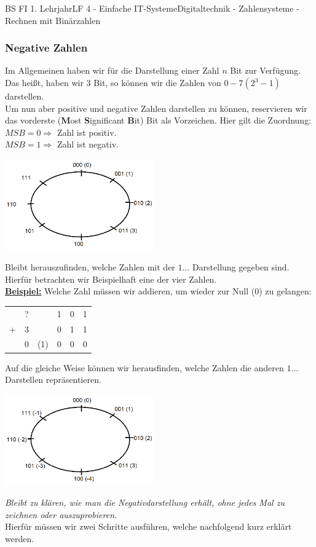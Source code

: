 \documentclass[11pt,twocolumn,oneside,openany,headings=optiontotoc,11pt,numbers=noenddot]{article}
\begin{document}
\begin{worksheet}{BS FI 1. Lehrjahr}{LF 4 - Einfache IT-Systeme}{Digitaltechnik - Zahlensysteme - Rechnen mit Binärzahlen}
		\subsubsection{Negative Zahlen}
		Im Allgemeinen haben wir für die Darstellung einer Zahl \(n\) Bit zur Verfügung. Das heißt, haben wir 3 Bit, so können wir die Zahlen von \(0 - 7 (2^3-1)\) darstellen.\\
		Um nun aber positive und negative Zahlen darstellen zu können, reservieren wir das vorderste (\textbf{M}ost \textbf{S}ignificant \textbf{B}it) Bit als Vorzeichen. Hier gilt die Zuordnung:\\
		\(MSB = 0 \Rightarrow\) Zahl ist positiv.\\
		\(MSB = 1 \Rightarrow\) Zahl ist negativ.\\
		\par\noindent
		\includegraphics[width=0.48\textwidth]{../99_Bilder/negZahlenkreisoZahlen.png}\\
		\par\noindent
		Bleibt herauszufinden, welche Zahlen mit der \(1\ldots\) Darstellung gegeben sind.\\
		Hierfür betrachten wir Beispielhaft eine der vier Zahlen.\\
		\textbf{\underline{Beispiel:}} Welche Zahl müssen wir addieren, um wieder zur Null (0) zu gelangen:\\
		\begin{tabularx}{0.48\textwidth}{rc|llll}
			 & ? & & 1 & 0 & 1\\
			 + & 3 & & 0 & 1 & 1\\
			 \cline{1-6}
			 & 0 & (1) & 0 & 0 & 0
		\end{tabularx}
		Auf die gleiche Weise können wir herausfinden, welche Zahlen die anderen \(1\dots\) Darstellen repräsentieren.\\
		\par\noindent
		\includegraphics[width=0.48\textwidth]{../99_Bilder/negZahlenkreis.png}\\
		\par\noindent
		\textit{Bleibt zu klären, wie man die Negativdarstellung erhält, ohne jedes Mal zu zeichnen oder auszuprobieren.}\\
		Hierfür müssen wir zwei Schritte ausführen, welche nachfolgend kurz erklärt werden.

\end{worksheet}
\end{document}
